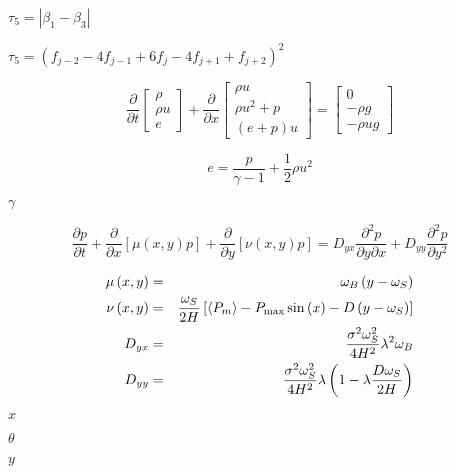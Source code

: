 \documentclass{article}
\begin{document}
$\tau_5 = \left|\beta_1 - \beta_3 \right|$
\pagebreak

$\tau_5 = \left( f_{j-2}-4f_{j-1}+6f_j-4f_{j+1}+f_{j+2} \right)^2$
\pagebreak

\begin{equation} \frac {\partial} {\partial t} \left[\begin{array}{c} \rho \\ \rho u \\ e \end{array}\right] + \frac {\partial} {\partial x} \left[\begin{array}{c} \rho u \\ \rho u^2 + p \\ (e+p) u\end{array}\right] = \left[\begin{array}{c} 0 \\ -\rho g \\ -\rho u g \end{array}\right] \end{equation}
\pagebreak

\begin{equation} e = \frac {p} {\gamma-1} + \frac{1}{2} \rho u^2 \end{equation}
\pagebreak

$\gamma$
\pagebreak

\begin{equation} \frac {\partial p} {\partial t} + \frac {\partial} {\partial x} \left[\mu\left(x,y\right)p\right] + \frac {\partial} {\partial y} \left[\nu\left(x,y\right)p\right] = D_{yx} \frac {\partial^2 p} {\partial y \partial x} + D_{yy} \frac {\partial^2 p} {\partial y^2} \end{equation}
\pagebreak

\begin{eqnarray} \mu\left(x,y\right) &=& \omega_B\left(y-\omega_S\right) \\ \nu\left(x,y\right) &=& \frac{\omega_S}{2H}\left[\left<P_m\right> - P_{\rm max} \sin\left(x\right) - D\left(y-\omega_S\right)\right] \\ D_{yx} &=& \frac {\sigma^2\omega_S^2} {4H^2} \lambda^2 \omega_B \\ D_{yy} &=& \frac {\sigma^2 \omega_S^2} {4H^2} \lambda \left( 1 - \lambda \frac {D \omega_S} {2H} \right) \end{eqnarray}
\pagebreak

$x$
\pagebreak

$\theta$
\pagebreak

$y$
\pagebreak
\end{document}
